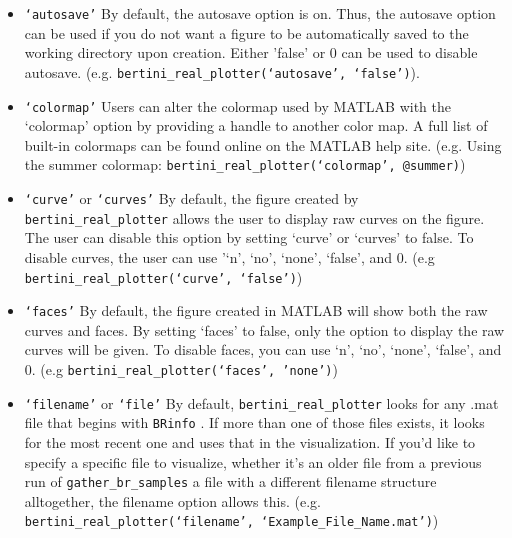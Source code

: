 \documentclass[10pt]{article}
\begin{document}
\begin{itemize}

\item \texttt{`autosave'} \newline
By default, the autosave option is on. Thus, the autosave option can be used if you do not want a figure to be automatically saved to the working directory upon creation. Either 'false' or 0 can be used to disable autosave. (e.g. \texttt{bertini\_real\_plotter(`autosave', `false')}).

\item \texttt{`colormap'} \newline
Users can alter the colormap used by MATLAB with the `colormap' option by providing a handle to another color map. A full list of built-in colormaps can be found online on the MATLAB help site. \newline (e.g. Using the summer colormap: \texttt{bertini\_real\_plotter(`colormap', @summer)})

\item \texttt{`curve'} or \texttt{`curves'} \newline
By default, the figure created by \texttt{bertini\_real\_plotter} allows the user to display raw curves on the figure. The user can disable this option by setting `curve'  or `curves' to false. To disable curves, the user can use '`n', `no', `none', `false', and 0. \newline (e.g \texttt{bertini\_real\_plotter(`curve', `false')})

\item \texttt{`faces'} \newline
By default, the figure created in MATLAB will show both the raw curves and faces. By setting `faces' to false, only the option to display the raw curves will be given. To disable faces, you can use `n', `no', `none', `false', and 0. \newline (e.g \texttt{bertini\_real\_plotter(`faces', 'none')})

\item \texttt{`filename'} or \texttt{`file'} \newline
By default, \texttt{bertini\_real\_plotter} looks for any .mat file that begins with \texttt{BRinfo} . If more than one of those files exists, it looks for the most recent one and uses that in the visualization. If you'd like to specify a specific file to visualize, whether it's an older file from a previous run of \texttt{gather\_br\_samples} a file with a different filename structure alltogether, the filename option allows this. \newline (e.g. \texttt{bertini\_real\_plotter(`filename', `Example\_File\_Name.mat')})


\end{itemize}
\end{document}
